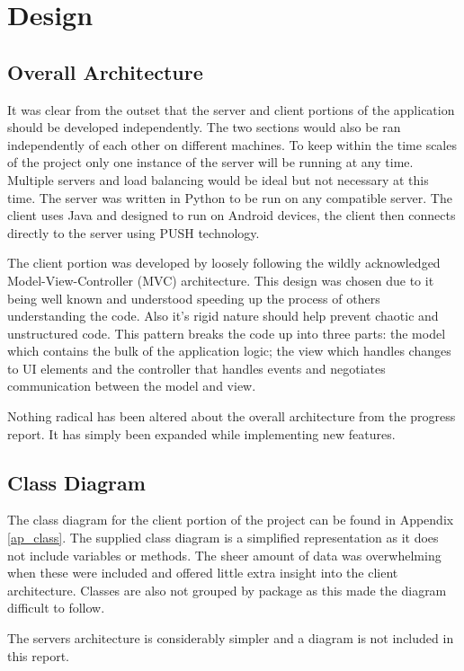 \chapter{Design}
\section{Overall Architecture}
It was clear from the outset that the server and client portions of the application should be developed independently. The two sections would also be ran independently of each other on different machines. To keep within the time scales of the project only one instance of the server will be running at any time. Multiple servers and load balancing would be ideal but not necessary at this time. The server was written in Python to be run on any compatible server. The client uses Java and designed to run on Android devices, the client then connects directly to the server using PUSH technology.

The client portion was developed by loosely following the wildly acknowledged Model-View-Controller (MVC) architecture. This design was chosen due to it being well known and understood speeding up the process of others understanding the code. Also it's rigid nature should help prevent chaotic and unstructured code. This pattern breaks the code up into three parts: the model which contains the bulk of the application logic; the view which handles changes to UI elements and the controller that handles events and negotiates communication between the model and view.

Nothing radical has been altered about the overall architecture from the progress report. It has simply been expanded while implementing new features.

\section{Class Diagram}
The class diagram for the client portion of the project can be found in Appendix \ref{ap_class}. The supplied class diagram is a simplified representation as it does not include variables or methods. The sheer amount of data was overwhelming when these were included and offered little extra insight into the client architecture. Classes are also not grouped by package as this made the diagram difficult to follow.

The servers architecture is considerably simpler and a diagram is not included in this report.

